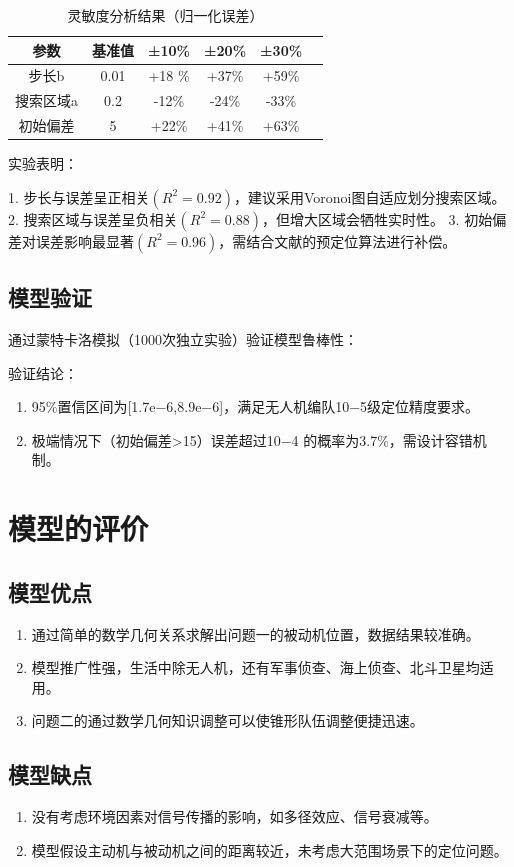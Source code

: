 \documentclass[withoutpreface,bwprint]{cumcmthesis} %
\begin{document}
\begin{table}[H]
    \centering
    \caption{灵敏度分析结果（归一化误差）}
    \label{tab:sensitivity}
    \begin{tabular}{c c c c c c}
    \toprule
    参数 & 基准值 & ±10\% & ±20\% & ±30\% \\
    \midrule
    步长b & 0.01 & +18 \% & +37\% & +59\% \\
    搜索区域a & 0.2 & -12\% & -24\% & -33\% \\
    初始偏差 & 5 & +22\% & +41\% & +63\% \\
    \bottomrule
    \end{tabular}
\end{table}

实验表明：

1.
步长与误差呈正相关$(R^2=0.92)$，建议采用Voronoi图自适应划分搜索区域。
2.
搜索区域与误差呈负相关$(R^2=0.88)$，但增大区域会牺牲实时性。
3.
初始偏差对误差影响最显著$(R^2=0.96)$，需结合文献的预定位算法进行补偿。
\subsection{模型验证}
通过蒙特卡洛模拟（1000次独立实验）验证模型鲁棒性：

验证结论：
    \begin{enumerate}
        \item 95\%置信区间为[1.7e−6,8.9e−6]，满足无人机编队10−5级定位精度要求。
        \item 极端情况下（初始偏差>15）误差超过10−4 的概率为3.7\%，需设计容错机制。
    \end{enumerate}


\section{模型的评价}
\subsection{模型优点}
\begin{enumerate}
    \item 通过简单的数学几何关系求解出问题一的被动机位置，数据结果较准确。
    \item 模型推广性强，生活中除无人机，还有军事侦查、海上侦查、北斗卫星均适用。
    \item 问题二的通过数学几何知识调整可以使锥形队伍调整便捷迅速。
\end{enumerate}

\subsection{模型缺点}
\begin{enumerate}
    \item 没有考虑环境因素对信号传播的影响，如多径效应、信号衰减等。
    \item 模型假设主动机与被动机之间的距离较近，未考虑大范围场景下的定位问题。
\end{enumerate}
\end{document}
